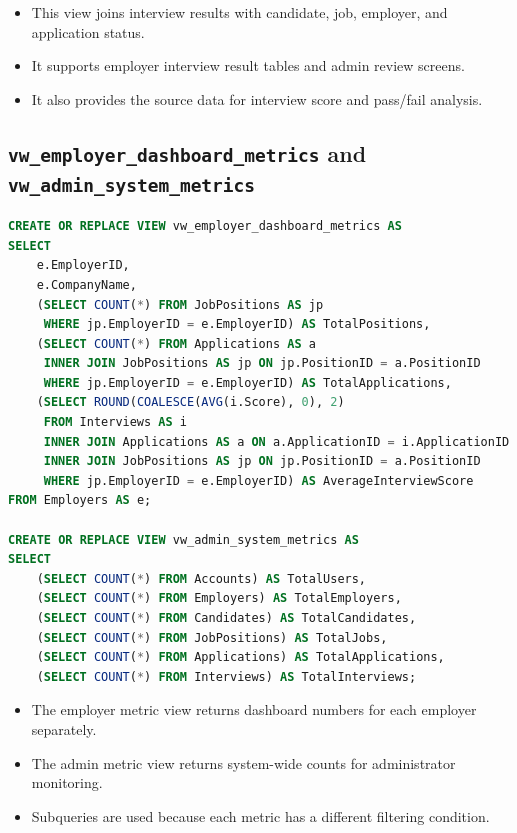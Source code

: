 \documentclass[11pt,a4paper]{report}
\begin{document}
\begin{itemize}[leftmargin=1.2cm,itemsep=0.1em]
  \item This view joins interview results with candidate, job, employer, and application status.
  \item It supports employer interview result tables and admin review screens.
  \item It also provides the source data for interview score and pass/fail analysis.
\end{itemize}

\subsection*{\texttt{vw\_employer\_dashboard\_metrics} and \texttt{vw\_admin\_system\_metrics}}

\begin{lstlisting}[language=SQL,caption={Dashboard metric views}]
CREATE OR REPLACE VIEW vw_employer_dashboard_metrics AS
SELECT
    e.EmployerID,
    e.CompanyName,
    (SELECT COUNT(*) FROM JobPositions AS jp
     WHERE jp.EmployerID = e.EmployerID) AS TotalPositions,
    (SELECT COUNT(*) FROM Applications AS a
     INNER JOIN JobPositions AS jp ON jp.PositionID = a.PositionID
     WHERE jp.EmployerID = e.EmployerID) AS TotalApplications,
    (SELECT ROUND(COALESCE(AVG(i.Score), 0), 2)
     FROM Interviews AS i
     INNER JOIN Applications AS a ON a.ApplicationID = i.ApplicationID
     INNER JOIN JobPositions AS jp ON jp.PositionID = a.PositionID
     WHERE jp.EmployerID = e.EmployerID) AS AverageInterviewScore
FROM Employers AS e;

CREATE OR REPLACE VIEW vw_admin_system_metrics AS
SELECT
    (SELECT COUNT(*) FROM Accounts) AS TotalUsers,
    (SELECT COUNT(*) FROM Employers) AS TotalEmployers,
    (SELECT COUNT(*) FROM Candidates) AS TotalCandidates,
    (SELECT COUNT(*) FROM JobPositions) AS TotalJobs,
    (SELECT COUNT(*) FROM Applications) AS TotalApplications,
    (SELECT COUNT(*) FROM Interviews) AS TotalInterviews;
\end{lstlisting}

\begin{itemize}[leftmargin=1.2cm,itemsep=0.1em]
  \item The employer metric view returns dashboard numbers for each employer separately.
  \item The admin metric view returns system-wide counts for administrator monitoring.
  \item Subqueries are used because each metric has a different filtering condition.
\end{itemize}
\end{document}

